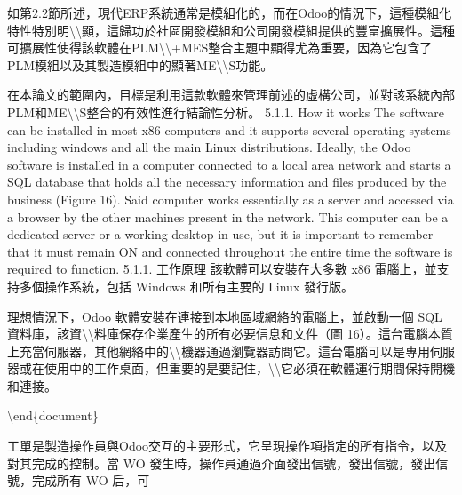 如第2.2節所述，現代ERP系統通常是模組化的，而在Odoo的情況下，這種模組化特性特別明\textbackslash\textbackslash 顯，這歸功於社區開發模組和公司開發模組提供的豐富擴展性。這種可擴展性使得該軟體在PLM\textbackslash\textbackslash+MES整合主題中顯得尤為重要，因為它包含了PLM模組以及其製造模組中的顯著ME\textbackslash\textbackslash S功能。

在本論文的範圍內，目標是利用這款軟體來管理前述的虛構公司，並對該系統內部PLM和ME\textbackslash\textbackslash S整合的有效性進行結論性分析。
5.1.1. How it works The software can be installed in most x86 computers
and it supports several operating systems including windows and all the
main Linux distributions. Ideally, the Odoo software is installed in a
computer connected to a local area network and starts a SQL database
that holds all the necessary information and files produced by the
business (Figure 16). Said computer works essentially as a server and
accessed via a browser by the other machines present in the network.
This computer can be a dedicated server or a working desktop in use, but
it is important to remember that it must remain ON and connected
throughout the entire time the software is required to function. 5.1.1.
工作原理 該軟體可以安裝在大多數 x86 電腦上，並支持多個操作系統，包括
Windows 和所有主要的 Linux 發行版。

理想情況下，Odoo 軟體安裝在連接到本地區域網絡的電腦上，並啟動一個 SQL
資料庫，該資\textbackslash\textbackslash 料庫保存企業產生的所有必要信息和文件（圖
16）。這台電腦本質上充當伺服器，其他網絡中的\textbackslash\textbackslash 機器通過瀏覽器訪問它。這台電腦可以是專用伺服器或在使用中的工作桌面，但重要的是要記住，\textbackslash\textbackslash 它必須在軟體運行期間保持開機和連接。

\textbackslash end\{document\}

工單是製造操作員與Odoo交互的主要形式，它呈現操作項指定的所有指令，以及對其完成的控制。當
WO 發生時，操作員通過介面發出信號，發出信號，發出信號，完成所有 WO
后，可
